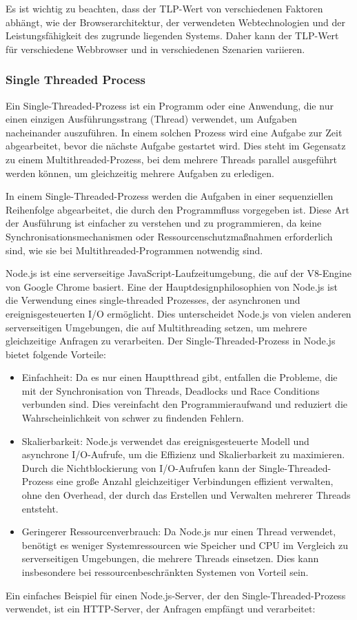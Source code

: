 Es ist wichtig zu beachten, dass der TLP-Wert von verschiedenen Faktoren abhängt, wie der Browserarchitektur, der verwendeten Webtechnologien und der Leistungsfähigkeit des zugrunde liegenden Systems. Daher kann der TLP-Wert für verschiedene Webbrowser und in verschiedenen Szenarien variieren.

\subsubsection{Single Threaded Process}
Ein Single-Threaded-Prozess ist ein Programm oder eine Anwendung, die nur einen einzigen Ausführungsstrang (Thread) verwendet, um Aufgaben nacheinander auszuführen. In einem solchen Prozess wird eine Aufgabe zur Zeit abgearbeitet, bevor die nächste Aufgabe gestartet wird. Dies steht im Gegensatz zu einem Multithreaded-Prozess, bei dem mehrere Threads parallel ausgeführt werden können, um gleichzeitig mehrere Aufgaben zu erledigen.

In einem Single-Threaded-Prozess werden die Aufgaben in einer sequenziellen Reihenfolge abgearbeitet, die durch den Programmfluss vorgegeben ist. Diese Art der Ausführung ist einfacher zu verstehen und zu programmieren, da keine Synchronisationsmechanismen oder Ressourcenschutzmaßnahmen erforderlich sind, wie sie bei Multithreaded-Programmen notwendig sind.

Node.js ist eine serverseitige JavaScript-Laufzeitumgebung, die auf der V8-Engine von Google Chrome basiert. Eine der Hauptdesignphilosophien von Node.js ist die Verwendung eines single-threaded Prozesses, der asynchronen und ereignisgesteuerten I/O ermöglicht. Dies unterscheidet Node.js von vielen anderen serverseitigen Umgebungen, die auf Multithreading setzen, um mehrere gleichzeitige Anfragen zu verarbeiten. Der Single-Threaded-Prozess in Node.js bietet folgende Vorteile:
\begin{itemize}
\item Einfachheit: Da es nur einen Hauptthread gibt, entfallen die Probleme, die mit der Synchronisation von Threads, Deadlocks und Race Conditions verbunden sind. Dies vereinfacht den Programmieraufwand und reduziert die Wahrscheinlichkeit von schwer zu findenden Fehlern.
\item Skalierbarkeit: Node.js verwendet das ereignisgesteuerte Modell und asynchrone I/O-Aufrufe, um die Effizienz und Skalierbarkeit zu maximieren. Durch die Nichtblockierung von I/O-Aufrufen kann der Single-Threaded-Prozess eine große Anzahl gleichzeitiger Verbindungen effizient verwalten, ohne den Overhead, der durch das Erstellen und Verwalten mehrerer Threads entsteht.
\item Geringerer Ressourcenverbrauch: Da Node.js nur einen Thread verwendet, benötigt es weniger Systemressourcen wie Speicher und CPU im Vergleich zu serverseitigen Umgebungen, die mehrere Threads einsetzen. Dies kann insbesondere bei ressourcenbeschränkten Systemen von Vorteil sein.
\end{itemize}
Ein einfaches Beispiel für einen Node.js-Server, der den Single-Threaded-Prozess verwendet, ist ein HTTP-Server, der Anfragen empfängt und verarbeitet:

